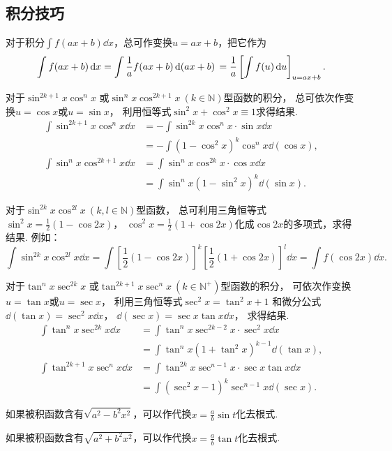 \subsection{积分技巧}
对于积分\(\int f(ax+b) \dd{x}\)，总可作变换\(u=ax+b\)，把它作为\[
	\int f(ax+b) \dd{x}
	= \int \frac{1}{a} f(ax+b) \dd{(ax+b)} \\
	= \frac{1}{a} \left[ \int f(u) \dd{u} \right]_{u=ax+b}.
\]

对于\(\sin^{2k+1} x \cos^n x\)
或\(\sin^n x \cos^{2k+1} x\ (k \in \mathbb{N})\)型函数的积分，
总可依次作变换\(u=\cos x\)或\(u=\sin x\)，
利用恒等式\(\sin^2 x + \cos^2 x \equiv 1\)求得结果.
\begin{align*}
	\int \sin^{2k+1} x \cos^n x \dd{x}
	&= - \int \sin^{2k} x \cos^n x \cdot \sin x \dd{x} \\
	&= - \int (1-\cos^2 x)^k \cos^n x \dd(\cos x), \\
	\int \sin^n x \cos^{2k+1} x \dd{x}
	&= \int \sin^n x \cos^{2k} x \cdot \cos x \dd{x} \\
	&= \int \sin^n x (1-\sin^2 x)^k \dd(\sin x).
\end{align*}

对于\(\sin^{2k} x \cos^{2l} x\ (k,l \in \mathbb{N})\)型函数，
总可利用三角恒等式\(\sin^2 x = \frac{1}{2}(1-\cos 2x)\)，
\(\cos^2 x = \frac{1}{2}(1+\cos 2x)\)化成\(\cos 2x\)的多项式，求得结果.
例如：\[
	\int \sin^{2k} x \cos^{2l} x \dd{x}
	= \int \left[\frac{1}{2}(1-\cos 2x)\right]^k
		\left[\frac{1}{2}(1+\cos 2x)\right]^l \dd{x}
	= \int f(\cos 2x) \dd{x}.
\]

对于\(\tan^n x \sec^{2k} x\)
或\(\tan^{2k+1} x \sec^n x\ (k \in \mathbb{N}^+)\)型函数的积分，
可依次作变换\(u=\tan x\)或\(u=\sec x\)，
利用三角恒等式\(\sec^2 x = \tan^2 x + 1\)
和微分公式\(\dd(\tan x) = \sec^2 x \dd{x}\)，
\(\dd(\sec x) = \sec x \tan x \dd{x}\)，
求得结果.
\begin{align*}
	\int \tan^n x \sec^{2k} x \dd{x}
	&=\int \tan^n x\sec^{2k-2} x \cdot \sec^2 x \dd{x} \\
	&=\int \tan^n x(1+\tan^2 x)^{k-1} \dd(\tan x), \\
	\int \tan^{2k+1} x \sec^n x \dd{x}
	&=\int \tan^{2k} x \sec^{n-1} x \cdot \sec x\tan x\dd{x} \\
	&=\int (\sec^2 x - 1)^k \sec^{n-1} x \dd(\sec x).
\end{align*}

如果被积函数含有\(\sqrt{a^2 - b^2 x^2}\)，可以作代换\(x = \frac{a}{b} \sin t\)化去根式.

如果被积函数含有\(\sqrt{a^2 + b^2 x^2}\)，可以作代换\(x = \frac{a}{b} \tan t\)化去根式.

